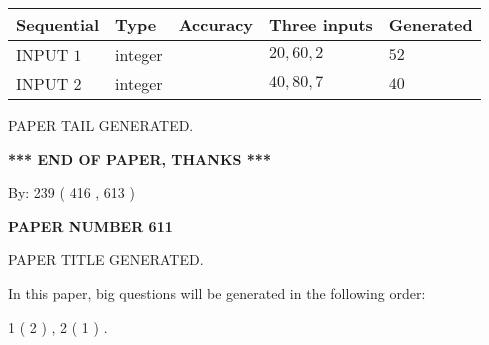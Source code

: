 \documentclass{ctexart}
\begin{document}
   
  
  
\noindent\begin{tabular}{|l|l|l|l|l|}
\hline
 Sequential & Type & Accuracy & Three inputs & Generated \\ 
\hline
 
 
  INPUT $  1 $ & integer &  & $
 20
 , 
 60
 , 
 2
 $ & $ 52 $ 
 \\  \hline  
 
 
  INPUT $  2 $ & integer &  & $
 40
 , 
 80
 , 
 7
 $ & $ 40 $ 
 \\  \hline  
 \end{tabular}
   
   
   
   
   
   
 \vspace{0.2in}
 
   
   
\vspace{2.0in} PAPER TAIL GENERATED.
   
   
   
   
\vspace{1.0in} 
{\textbf{\large{ *** END OF PAPER, THANKS *** }}} 
   
   
\hspace{1.0in} By: 
 239 ( 416 ,  613 )
   
   
   
   
\newpage 
\setcounter{page}{ 
   611001 } 
   
   
   
   
 {\textbf{ \Large{ PAPER NUMBER  611  }}}
   
   
\vspace{0.2in}
   
   
   
   
   
   
   
   
 \vspace{0.2in}
 
 
 
 
   
   
 PAPER TITLE GENERATED.
   
   
   
\vspace{0.2in}
   
In this paper, big questions will be generated in the following order: 
   
   
   1 ( 2 )
 ,
   2 ( 1 )
 .
  
\end{document}
